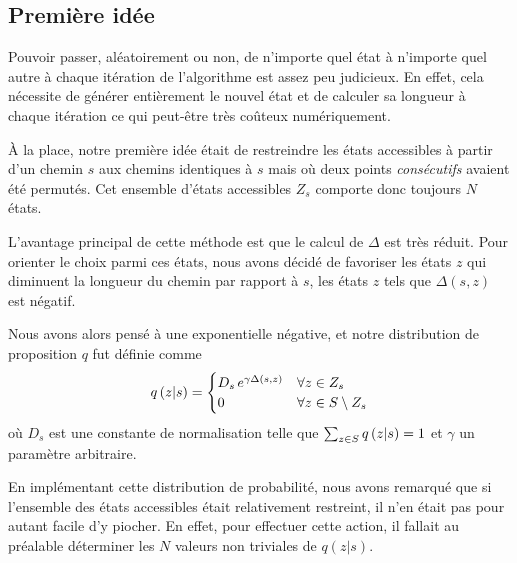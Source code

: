\documentclass[a4paper, 12pt]{report}
\begin{document}
	\subsection{Première idée}
    Pouvoir passer, aléatoirement ou non, de n'importe quel état à n'importe quel autre à chaque itération de l'algorithme est assez peu judicieux. En effet, cela nécessite de générer entièrement le nouvel état et de calculer sa longueur à chaque itération ce qui peut-être très coûteux numériquement. \par
    À la place, notre première idée était de restreindre les états accessibles à partir d'un chemin $s$ aux chemins identiques à $s$ mais où deux points \emph{consécutifs} avaient été permutés. Cet ensemble d'états accessibles $Z_s$ comporte donc toujours $N$ états. \par
    L'avantage principal de cette méthode est que le calcul de $\Delta$ est très réduit.
    Pour orienter le choix parmi ces états, nous avons décidé de favoriser les états $z$ qui diminuent la longueur du chemin par rapport à $s$, \cad{} les états $z$ tels que $\Delta(s, z)$ est négatif. \par
    Nous avons alors pensé à une exponentielle négative, et notre distribution de proposition $q$ fut définie comme
    \begin{equation}
        q\left(z | s\right) =
        \begin{cases}
            D_s \, e^{\gamma \Delta(s, z)} & \forall z \in Z_s \\
            0 & \forall z \in S \setminus Z_s
        \end{cases}
    \end{equation}
    où $D_s$ est une constante de normalisation telle que $\sum_{z \in S} q\left(z | s\right) = 1$ et $\gamma$ un paramètre arbitraire. \par
    En implémentant cette distribution de probabilité, nous avons remarqué que si l'ensemble des états accessibles était relativement restreint, il n'en était pas pour autant facile d'y piocher. En effet, pour effectuer cette action, il fallait au préalable déterminer les $N$ valeurs non triviales de $q(z|s)$.
\end{document}
